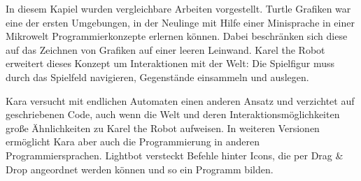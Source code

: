 In diesem Kapiel wurden vergleichbare Arbeiten vorgestellt. Turtle Grafiken war eine der ersten Umgebungen, in der Neulinge mit Hilfe einer Minisprache in einer Mikrowelt Programmierkonzepte erlernen können. Dabei beschränken sich diese auf das Zeichnen von Grafiken auf einer leeren Leinwand. Karel the Robot erweitert dieses Konzept um Interaktionen mit der Welt: Die Spielfigur muss durch das Spielfeld navigieren, Gegenstände einsammeln und auslegen.

Kara versucht mit endlichen Automaten einen anderen Ansatz und verzichtet auf geschriebenen Code, auch wenn die Welt und deren Interaktionsmöglichkeiten große Ähnlichkeiten zu Karel the Robot aufweisen. In weiteren Versionen ermöglicht Kara aber auch die Programmierung in anderen Programmiersprachen. Lightbot versteckt Befehle hinter Icons, die per Drag \& Drop angeordnet werden können und so ein Programm bilden.
